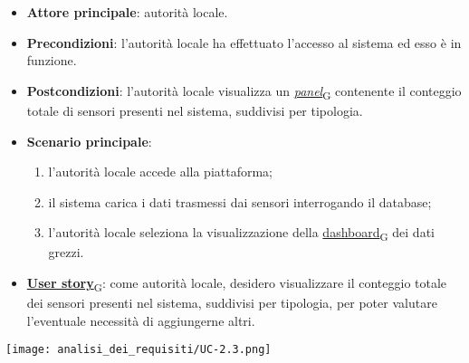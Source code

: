 \begin{itemize}
	\item \textbf{Attore principale}: autorità locale.
	\item \textbf{Precondizioni}: l'autorità locale ha effettuato l'accesso al sistema ed esso è in funzione.
	\item \textbf{Postcondizioni}: l'autorità locale visualizza un \href{https://7last.github.io/docs/pb/documentazione-interna/glossario\#panel}{\textit{panel}\textsubscript{G}} contenente il conteggio totale di sensori presenti nel sistema, suddivisi per tipologia.
	\item \textbf{Scenario principale}:
	      \begin{enumerate}
		      \item l'autorità locale accede alla piattaforma;
		      \item il sistema carica i dati trasmessi dai sensori interrogando il database;
		      \item l'autorità locale seleziona la visualizzazione della \href{https://7last.github.io/docs/pb/documentazione-interna/glossario\#dashboard}{dashboard\textsubscript{G}} dei dati grezzi.
	      \end{enumerate}
	\item \href{https://7last.github.io/docs/pb/documentazione-interna/glossario\#user-story}{\textbf{User story}\textsubscript{G}}:
	      come autorità locale, desidero visualizzare il conteggio totale dei sensori presenti nel sistema, suddivisi per tipologia, per poter valutare l'eventuale necessità di aggiungerne altri.
\end{itemize}
\begin{center}
	\texttt{[image: analisi\_dei\_requisiti/UC-2.3.png]}
\end{center}

